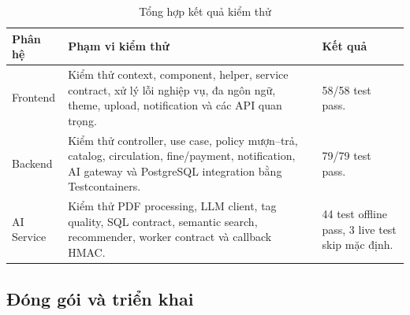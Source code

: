 \begin{table}[H]
\centering
\small %
\setlength{\tabcolsep}{8pt} %
\renewcommand{\arraystretch}{1.4} %

\begin{tabularx}{\textwidth}{|p{2.5cm}|X|p{3.5cm}|}
\hline
\textbf{Phân hệ} & \textbf{Phạm vi kiểm thử} & \textbf{Kết quả} \\
\hline
Frontend &
Kiểm thử context, component, helper, service contract, xử lý lỗi nghiệp vụ, đa ngôn ngữ, theme, upload, notification và các API quan trọng. &
58/58 test pass. \\
\hline
Backend &
Kiểm thử controller, use case, policy mượn--trả, catalog, circulation, fine/payment, notification, AI gateway và PostgreSQL integration bằng Testcontainers. &
79/79 test pass. \\
\hline
AI Service &
Kiểm thử PDF processing, LLM client, tag quality, SQL contract, semantic search, recommender, worker contract và callback HMAC. &
44 test offline pass, 3 live test skip mặc định. \\
\hline
\end{tabularx}
\caption{Tổng hợp kết quả kiểm thử}
\label{tab:conclusion_testing_results}
\end{table}

\subsection{Đóng gói và triển khai}

